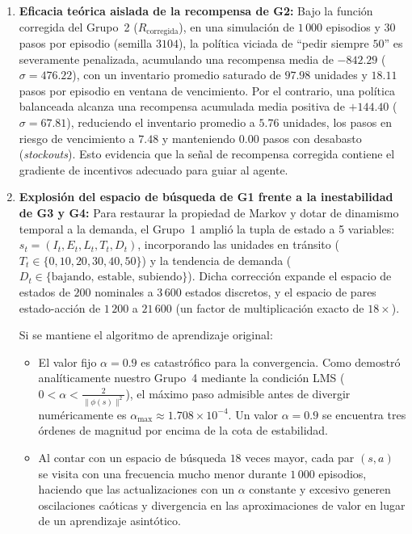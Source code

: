 \documentclass[11pt,letterpaper]{article}
\begin{document}
\begin{enumerate}
    \item \textbf{Eficacia teórica aislada de la recompensa de G2:}
    Bajo la función corregida del Grupo~2 ($R_{\text{corregida}}$), en una simulación de $1\,000$ episodios y $30$ pasos por episodio (semilla $3104$), la política viciada de ``pedir siempre $50$'' es severamente penalizada, acumulando una recompensa media de $-842.29$ ($\sigma = 476.22$), con un inventario promedio saturado de $97.98$ unidades y $18.11$ pasos por episodio en ventana de vencimiento. Por el contrario, una política balanceada alcanza una recompensa acumulada media positiva de $+144.40$ ($\sigma = 67.81$), reduciendo el inventario promedio a $5.76$ unidades, los pasos en riesgo de vencimiento a $7.48$ y manteniendo $0.00$ pasos con desabasto (\textit{stockouts}). Esto evidencia que la señal de recompensa corregida contiene el gradiente de incentivos adecuado para guiar al agente.

    \item \textbf{Explosión del espacio de búsqueda de G1 frente a la inestabilidad de G3 y G4:}
    Para restaurar la propiedad de Markov y dotar de dinamismo temporal a la demanda, el Grupo~1 amplió la tupla de estado a 5 variables: $s_t = (I_t, E_t, L_t, T_t, D_t)$, incorporando las unidades en tránsito ($T_t \in \{0, 10, 20, 30, 40, 50\}$) y la tendencia de demanda ($D_t \in \{\text{bajando, estable, subiendo}\}$). Dicha corrección expande el espacio de estados de $200$ nominales a $3\,600$ estados discretos, y el espacio de pares estado-acción de $1\,200$ a $21\,600$ (un factor de multiplicación exacto de $18\times$).

    Si se mantiene el algoritmo de aprendizaje original:
    \begin{itemize}
        \item El valor fijo $\alpha = 0.9$ es catastrófico para la convergencia. Como demostró analíticamente nuestro Grupo~4 mediante la condición LMS ($0 < \alpha < \frac{2}{\|\phi(s)\|^2}$), el máximo paso admisible antes de divergir numéricamente es $\alpha_{\max} \approx 1.708 \times 10^{-4}$. Un valor $\alpha = 0.9$ se encuentra tres órdenes de magnitud por encima de la cota de estabilidad.
        \item Al contar con un espacio de búsqueda $18$ veces mayor, cada par $(s, a)$ se visita con una frecuencia mucho menor durante $1\,000$ episodios, haciendo que las actualizaciones con un $\alpha$ constante y excesivo generen oscilaciones caóticas y divergencia en las aproximaciones de valor en lugar de un aprendizaje asintótico.
    \end{itemize}


\end{enumerate}
\end{document}
